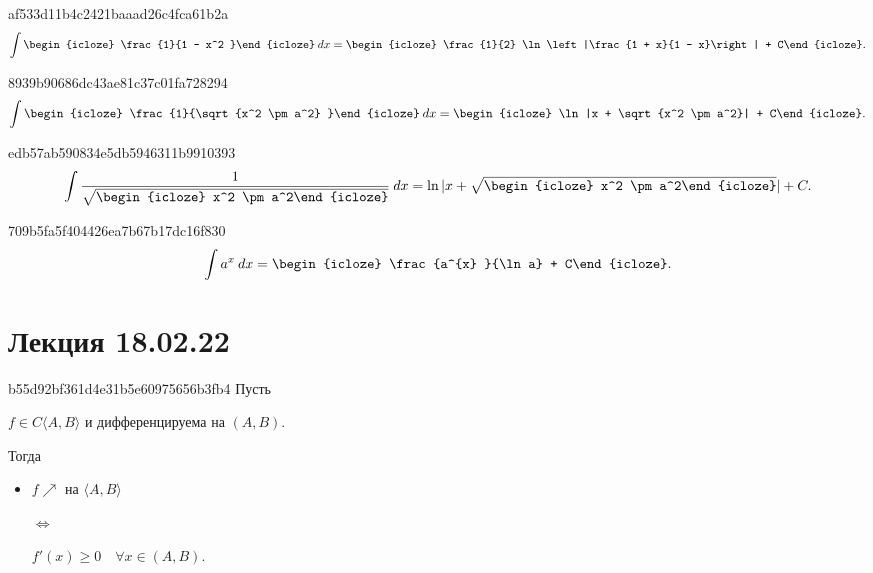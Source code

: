 \begin{note}{af533d11b4c2421baaad26c4fca61b2a}
    \[
        \int \begin{icloze}{2}\frac{1}{1 - x^2 }\end{icloze} \: dx = \begin{icloze}{1}\frac{1}{2} \ln\left|\frac{1 + x}{1 - x}\right| + C\end{icloze}.
    \]
\end{note}

\begin{note}{8939b90686dc43ae81c37c01fa728294}
    \[
        \begin{gathered}
            \int \begin{icloze}{2}\frac{1}{\sqrt{x^2 \pm a^2} }\end{icloze} \: dx = \begin{icloze}{1}\ln |x + \sqrt{x^2 \pm a^2}| + C\end{icloze}.
        \end{gathered}
    \]
\end{note}

\begin{note}{edb57ab590834e5db5946311b9910393}
    \[
        \int \frac{1}{\sqrt{\begin{icloze}{1}x^2 \pm a^2\end{icloze}} } \: dx = \ln |x + \sqrt{\begin{icloze}{1}x^2 \pm a^2\end{icloze}}| + C.
    \]
\end{note}

\begin{note}{709b5fa5f404426ea7b67b17dc16f830}
    \[
        \int a^{x} \: dx = \begin{icloze}{1}\frac{a^{x} }{\ln a} + C\end{icloze}.
    \]
\end{note}

\section{Лекция 18.02.22}
\begin{note}{b55d92bf361d4e31b5e60975656b3fb4}
    Пусть \begin{icloze}{4}\( f \in C\langle A, B \rangle  \) и дифференцируема на \( (A, B) \).\end{icloze} Тогда
    \begin{itemize}
        \item {}\begin{icloze}{2}\( f \!\nearrow \) на \( \langle A, B \rangle  \)\end{icloze}
            \begin{icloze}{3}\( \iff  \)\end{icloze}
            \begin{icloze}{1}\( f'(x) \geqslant 0 \quad \forall x \in (A, B) \).\end{icloze}
    \end{itemize}
\end{note}

